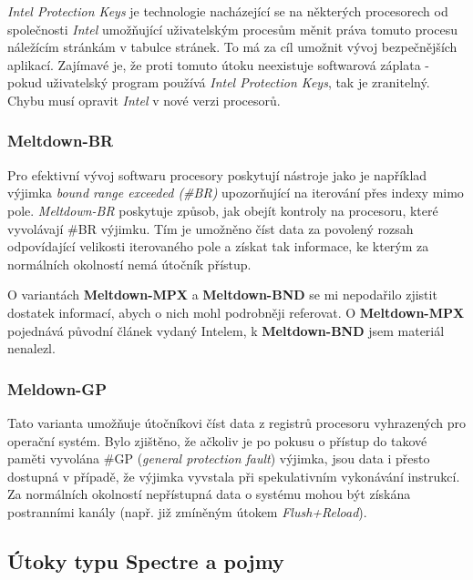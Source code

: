 \textit{Intel Protection Keys} je technologie nacházející se na některých procesorech od společnosti \textit{Intel} umožňující uživatelským procesům měnit práva tomuto procesu náležícím stránkám v tabulce stránek.
To má za cíl umožnit vývoj bezpečnějších aplikací.
Zajímavé je, že proti tomuto útoku neexistuje softwarová záplata - pokud uživatelský program používá \textit{Intel Protection Keys}, tak je zranitelný.
Chybu musí opravit \textit{Intel} v nové verzi procesorů.

\subsubsection{Meltdown-BR}

Pro efektivní vývoj softwaru procesory poskytují nástroje jako je například výjimka \textit{bound range exceeded (\#BR)} upozorňující na iterování přes indexy mimo pole.
\textit{Meltdown-BR} poskytuje způsob, jak obejít kontroly na procesoru, které vyvolávají \#BR výjimku.
Tím je umožněno číst data za povolený rozsah odpovídající velikosti iterovaného pole a získat tak informace, ke kterým za normálních okolností nemá útočník přístup.

O variantách \textbf{Meltdown-MPX} a \textbf{Meltdown-BND} se mi nepodařilo zjistit dostatek informací, abych o nich mohl podrobněji referovat.
O \textbf{Meltdown-MPX} pojednává původní článek vydaný Intelem, k \textbf{Meltdown-BND} jsem materiál nenalezl.

\subsubsection{Meldown-GP}

Tato varianta umožňuje útočníkovi číst data z registrů procesoru vyhrazených pro operační systém.
Bylo zjištěno, že ačkoliv je po pokusu o přístup do takové paměti vyvolána \#GP (\textit{general protection fault}) výjimka, jsou data i přesto dostupná v případě, že výjimka vyvstala při spekulativním vykonávání instrukcí.
Za normálních okolností nepřístupná data o systému mohou být získána postranními kanály (např. již zmíněným útokem \textit{Flush+Reload}).

\subsection{Útoky typu Spectre a pojmy}

